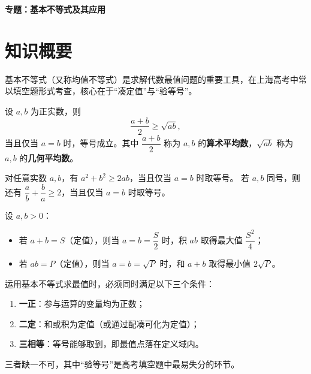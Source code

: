 \documentclass[11pt]{ctexrep}
\begin{document}
\begin{center}
    {\Large\bfseries 专题：基本不等式及其应用}
\end{center}

\section*{知识概要}

基本不等式（又称均值不等式）是求解代数最值问题的重要工具，在上海高考中常以填空题形式考查，核心在于“凑定值”与“验等号”。

\begin{definition}[基本不等式]
    设 $a, b$ 为正实数，则
    \[
        \frac{a+b}{2} \ge \sqrt{ab},
    \]
    当且仅当 $a = b$ 时，等号成立。其中 $\dfrac{a+b}{2}$ 称为 $a, b$ 的\textbf{算术平均数}，$\sqrt{ab}$ 称为 $a, b$ 的\textbf{几何平均数}。
\end{definition}

\begin{definition}[代数变形]
    对任意实数 $a, b$，有 $a^{2} + b^{2} \ge 2ab$，当且仅当 $a = b$ 时取等号。
    若 $a, b$ 同号，则还有 $\dfrac{a}{b} + \dfrac{b}{a} \ge 2$，当且仅当 $a = b$ 时取等号。
\end{definition}

\begin{definition}
    设 $a, b > 0$：
    \begin{itemize}
        \item 若 $a + b = S$（定值），则当 $a = b = \dfrac{S}{2}$ 时，积 $ab$ 取得最大值 $\dfrac{S^{2}}{4}$；
        \item 若 $ab = P$（定值），则当 $a = b = \sqrt{P}$ 时，和 $a + b$ 取得最小值 $2\sqrt{P}$。
    \end{itemize}
\end{definition}

\begin{property}
    运用基本不等式求最值时，必须同时满足以下三个条件：
    \begin{enumerate}
        \item \textbf{一正}：参与运算的变量均为正数；
        \item \textbf{二定}：和或积为定值（或通过配凑可化为定值）；
        \item \textbf{三相等}：等号能够取到，即最值点落在定义域内。
    \end{enumerate}
    三者缺一不可，其中“验等号”是高考填空题中最易失分的环节。
\end{property}
\end{document}
